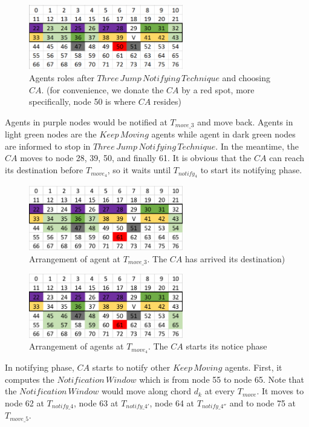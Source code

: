 \begin{figure}[H]
  \centering  
  \includegraphics[width=0.6\textwidth]{figures/T50.png}
  \caption{Agents roles after $Three\,Jump\,Notifying\,Technique$ and choosing $CA$. (for convenience, we donate the $CA$ by a red spot, more specifically, node 50 is where $CA$ resides)}\label{fig:T50}
\end{figure}

Agents in purple nodes would be notified at $T_{move\_3}$ and move back. Agents in light green nodes are the $Keep\,Moving$ agents while agent in dark green nodes are informed to stop in $Three\,Jump\,Notifying\,Technique$. In the meantime, the $CA$ moves to node 28, 39, 50, and finally 61. It is obvious that the $CA$ can reach its destination before $T_{move_4}$, so it waits until $T_{notify_4}$ to start its notifying phase. 

\begin{figure}[H]
  \centering  
  \includegraphics[width=0.6\textwidth]{figures/T611.png}
  \caption{Arrangement of agent at $T_{move\_3}$. The $CA$ has arrived its destination)}\label{fig:T611}
\end{figure}

\begin{figure}[H]
  \centering  
  \includegraphics[width=0.6\textwidth]{figures/T612.png}
  \caption{Arrangement of agents at $T_{move_4}$. The $CA$ starts its notice phase}\label{fig:T612}
\end{figure}
In notifying phase, $CA$ starts to notify other $Keep\,Moving$ agents. First, it computes the $Notification\,Window$ which is from node 55 to node 65. Note that the $Notification\,Window$ would move along chord $d_k$ at every $T_{move}$. It moves to node 62 at $T_{notify\_4}$, node 63 at $T_{notify\_4'}$, node 64 at $T_{notify\_4''}$ and to node 75 at $T_{move\_5}$.

